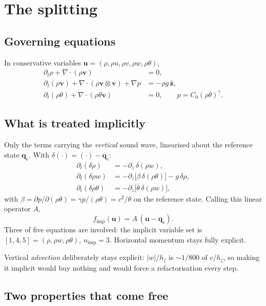 \documentclass[11pt,a4paper]{article}
\newcommand{\uvec}{\bm{u}}
\newcommand{\qe}{\bm{q}_{\mathrm{e}}}
\newcommand{\fimp}{f_{\mathrm{imp}}}
\begin{document}
\section{The splitting}

\subsection{Governing equations}
In conservative variables $\uvec=(\rho,\rho u,\rho v,\rho w,\rho\theta)$,
\begin{align}
\partial_t \rho + \nabla\!\cdot(\rho\bm{v}) &= 0,\\
\partial_t (\rho\bm{v}) + \nabla\!\cdot(\rho\bm{v}\otimes\bm{v}) + \nabla p
   &= -\rho g\,\hat{\bm{z}},\\
\partial_t (\rho\theta) + \nabla\!\cdot(\rho\theta\bm{v}) &= 0,
\qquad p = C_0 (\rho\theta)^{\gamma}.
\end{align}

\subsection{What is treated implicitly}
Only the terms carrying the \emph{vertical} sound wave, linearised about the
reference state $\qe$. With $\delta(\cdot)=(\cdot)-\qe$:
\begin{align}
\partial_t (\delta\rho)        &= -\partial_z\,\delta(\rho w),\\
\partial_t (\delta\rho w)      &= -\partial_z\!\big[\beta\,\delta(\rho\theta)\big] - g\,\delta\rho,\\
\partial_t (\delta\rho\theta)  &= -\partial_z\!\big[\bar\theta\,\delta(\rho w)\big],
\end{align}
with $\beta=\partial p/\partial(\rho\theta)=\gamma p/(\rho\theta)=c^2/\theta$
on the reference state. Calling this linear operator $A$,
\begin{equation}
\fimp(\uvec) = A\,(\uvec-\qe).
\end{equation}
Three of five equations are involved: the implicit variable set is
$[1,4,5]=(\rho,\rho w,\rho\theta)$, $n_{\mathrm{imp}}=3$. Horizontal momentum
stays fully explicit.

Vertical \emph{advection} deliberately stays explicit: $|w|/h_\zeta$ is
$\sim 1/800$ of $c/h_\zeta$, so making it implicit would buy nothing and would
force a refactorisation every step.

\subsection{Two properties that come free}
\end{document}
